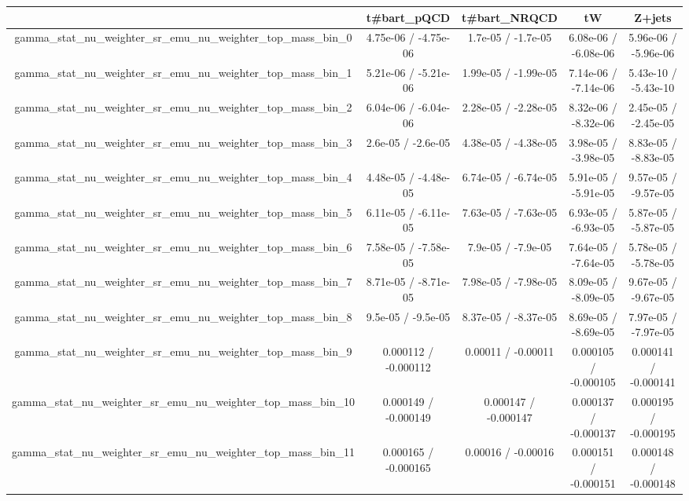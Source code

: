 \documentclass[10pt]{article}
\begin{document}
\begin{table}[htbp]
\begin{center}
\begin{tabular}{|c|c|c|c|c|}
\hline 
      & t#bar{t}_{pQCD}      & t#bar{t}_{NRQCD}      & tW      & Z+jets \\ 
\hline 
  gamma_stat_nu_weighter_sr_emu_nu_weighter_top_mass_bin_0 & 4.75e-06 / -4.75e-06 & 1.7e-05 / -1.7e-05 & 6.08e-06 / -6.08e-06 & 5.96e-06 / -5.96e-06 \\ 
  gamma_stat_nu_weighter_sr_emu_nu_weighter_top_mass_bin_1 & 5.21e-06 / -5.21e-06 & 1.99e-05 / -1.99e-05 & 7.14e-06 / -7.14e-06 & 5.43e-10 / -5.43e-10 \\ 
  gamma_stat_nu_weighter_sr_emu_nu_weighter_top_mass_bin_2 & 6.04e-06 / -6.04e-06 & 2.28e-05 / -2.28e-05 & 8.32e-06 / -8.32e-06 & 2.45e-05 / -2.45e-05 \\ 
  gamma_stat_nu_weighter_sr_emu_nu_weighter_top_mass_bin_3 & 2.6e-05 / -2.6e-05 & 4.38e-05 / -4.38e-05 & 3.98e-05 / -3.98e-05 & 8.83e-05 / -8.83e-05 \\ 
  gamma_stat_nu_weighter_sr_emu_nu_weighter_top_mass_bin_4 & 4.48e-05 / -4.48e-05 & 6.74e-05 / -6.74e-05 & 5.91e-05 / -5.91e-05 & 9.57e-05 / -9.57e-05 \\ 
  gamma_stat_nu_weighter_sr_emu_nu_weighter_top_mass_bin_5 & 6.11e-05 / -6.11e-05 & 7.63e-05 / -7.63e-05 & 6.93e-05 / -6.93e-05 & 5.87e-05 / -5.87e-05 \\ 
  gamma_stat_nu_weighter_sr_emu_nu_weighter_top_mass_bin_6 & 7.58e-05 / -7.58e-05 & 7.9e-05 / -7.9e-05 & 7.64e-05 / -7.64e-05 & 5.78e-05 / -5.78e-05 \\ 
  gamma_stat_nu_weighter_sr_emu_nu_weighter_top_mass_bin_7 & 8.71e-05 / -8.71e-05 & 7.98e-05 / -7.98e-05 & 8.09e-05 / -8.09e-05 & 9.67e-05 / -9.67e-05 \\ 
  gamma_stat_nu_weighter_sr_emu_nu_weighter_top_mass_bin_8 & 9.5e-05 / -9.5e-05 & 8.37e-05 / -8.37e-05 & 8.69e-05 / -8.69e-05 & 7.97e-05 / -7.97e-05 \\ 
  gamma_stat_nu_weighter_sr_emu_nu_weighter_top_mass_bin_9 & 0.000112 / -0.000112 & 0.00011 / -0.00011 & 0.000105 / -0.000105 & 0.000141 / -0.000141 \\ 
  gamma_stat_nu_weighter_sr_emu_nu_weighter_top_mass_bin_10 & 0.000149 / -0.000149 & 0.000147 / -0.000147 & 0.000137 / -0.000137 & 0.000195 / -0.000195 \\ 
  gamma_stat_nu_weighter_sr_emu_nu_weighter_top_mass_bin_11 & 0.000165 / -0.000165 & 0.00016 / -0.00016 & 0.000151 / -0.000151 & 0.000148 / -0.000148 \\ 

\end{tabular}
\end{center}
\end{table}
\end{document}
